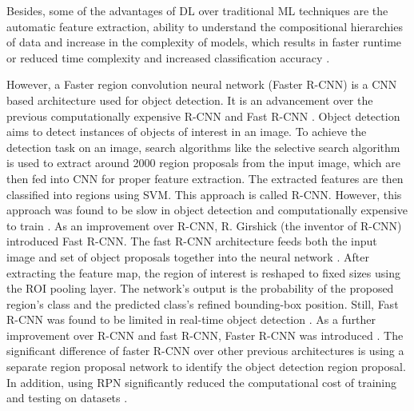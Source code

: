 Besides, some of the advantages of DL over traditional ML techniques are the automatic feature extraction, ability to understand the compositional hierarchies of data and increase in the complexity of models, which results in faster runtime or reduced time complexity and increased classification accuracy \cite{kamilaris2018deep}.

However, a Faster region convolution neural network (Faster R-CNN) is a CNN based architecture used for object detection. It is an advancement over the previous computationally expensive R-CNN and Fast R-CNN \cite{ren2015faster}. Object detection aims to detect instances of objects of interest in an image. To achieve the detection task on an image, search algorithms like the selective search algorithm is used to extract around 2000 region proposals from the input image, which are then fed into CNN for proper feature extraction\cite{girshick2014rich}. The extracted features are then classified into regions using SVM. This approach is called R-CNN. However, this approach was found to be slow in object detection and computationally expensive to train \cite{girshick2015fast}. As an improvement over R-CNN, R. Girshick (the inventor of R-CNN) introduced Fast R-CNN. The fast R-CNN architecture feeds both the input image and set of object proposals together into the neural network \cite{girshick2015fast}. After extracting the feature map, the region of interest is reshaped to fixed sizes using the ROI pooling layer. The network’s output is the probability of the proposed region’s class and the predicted class’s refined bounding-box position.
Still, Fast R-CNN was found to be limited in real-time object detection \cite{zou2019object}.
As a further improvement over R-CNN and fast R-CNN, Faster R-CNN was introduced \cite{ren2015faster}. The significant difference of faster R-CNN over other previous architectures is using a separate region proposal network to identify the object detection region proposal. In addition, using RPN significantly reduced the computational cost of training and testing on datasets \cite{ren2015faster}.

